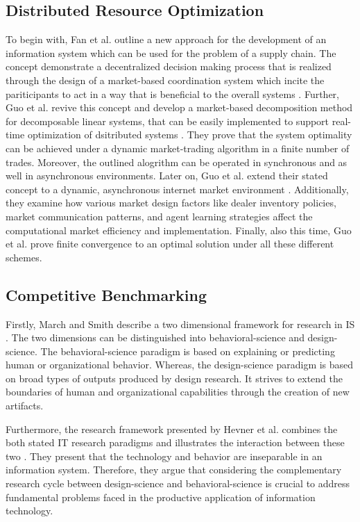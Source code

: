\subsection{Distributed Resource Optimization}
\label{sec:Distributed Resource Optimization}
To begin with, Fan et al. outline a new approach for the development of an information system which can be used for the problem of a supply chain. The concept demonstrate a decentralized decision making process that is realized through the design of a market-based coordination system which incite the pariticipants to act in a way that is beneficial to the overall systems . Further, Guo et al. revive this concept and develop a market-based decomposition method for decomposable linear systems, that can be easily implemented to support real-time optimization of dsitributed systems . They prove that the system optimality can be achieved under a dynamic market-trading algorithm in a finite number of trades. Moreover, the outlined alogrithm can be operated in synchronous and as well in asynchronous environments. Later on, Guo et al. extend their stated concept to a dynamic, asynchronous internet market environment . Additionally, they examine how various market design factors like dealer inventory policies, market communication patterns, and agent learning strategies affect the computational market efficiency and implementation. Finally, also this time, Guo et al. prove finite convergence to an optimal solution under all these different schemes. 

\subsection{Competitive Benchmarking}
Firstly, March and Smith describe a two dimensional framework for research in IS . The two dimensions can be distinguished into behavioral-science and design-science. The behavioral-science paradigm is based on explaining or predicting human or organizational behavior. Whereas, the design-science paradigm is based on broad types of outputs produced by design research. It strives to extend the boundaries of human and organizational capabilities through the creation of new artifacts. 

Furthermore, the research framework presented by Hevner et al. combines the both stated IT research paradigms and illustrates the interaction between these two . They present that the technology and behavior are inseparable in an information system. Therefore, they argue that considering the complementary research cycle between design-science and behavioral-science is crucial to address fundamental problems faced in the productive application of information technology.        

